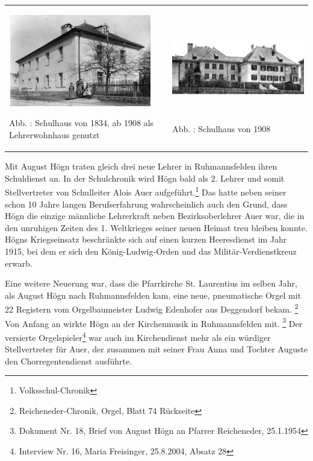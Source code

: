 \documentclass[a4paper]{article}
\newcounter{Abb}
\renewcommand\theAbb{\arabic{Abb}}
\begin{document}
\begin{flushleft}
\tablefirsthead{}
\tablehead{}
\tabletail{}
\tablelasttail{}
\begin{supertabular}{m{6.452cm}m{9.653cm}}

\includegraphics[width=6.269cm,height=3.999cm]{pictures/zulassungsarbeit-img017.jpg}

\label{bkm:Ref100034971}Abb. \stepcounter{Abb}{\theAbb}: Schulhaus von
1834, ab 1908 als Lehrerwohnhaus genutzt &

\includegraphics[width=9.47cm,height=4.001cm]{pictures/zulassungsarbeit-img018.jpg}

\label{bkm:Ref100034935}Abb. \stepcounter{Abb}{\theAbb}: Schulhaus von
1908\\
\end{supertabular}
\end{flushleft}
Mit August Högn traten gleich drei neue Lehrer in Ruhmannsfelden ihren
Schuldienst an. In der Schulchronik wird Högn bald als 2. Lehrer und
somit Stellvertreter von Schulleiter Alois Auer aufgeführt.\footnote{
Volksschul-Chronik} Das hatte neben seiner schon 10 Jahre langen
Berufserfahrung wahrscheinlich auch den Grund, dass Högn die einzige
männliche Lehrerkraft neben Bezirksoberlehrer Auer war, die in den
unruhigen Zeiten des 1. Weltkrieges seiner neuen Heimat treu bleiben
konnte. Högns Kriegseinsatz beschränkte sich auf einen kurzen
Heeresdienst im Jahr 1915, bei dem er sich den König-Ludwig-Orden und
das Militär-Verdienstkreuz erwarb.

Eine weitere Neuerung war, dass die Pfarrkirche St. Laurentius im selben
Jahr, als August Högn nach Ruhmannsfelden kam, eine neue, pneumatische
Orgel mit 22 Registern vom Orgelbaumeister Ludwig Edenhofer aus
Deggendorf bekam. \footnote{Reicheneder-Chronik, Orgel, Blatt 74
Rückseite} Von Anfang an wirkte Högn an der Kirchenmusik in
Ruhmannsfelden mit. \footnote{Dokument Nr. 18, Brief von August Högn an
Pfarrer Reicheneder, 25.1.1954} Der versierte Orgelspieler\footnote{
Interview Nr. 16, Maria Freisinger, 25.8.2004, Absatz 28} war auch im
Kirchendienst mehr als ein würdiger Stellvertreter für Auer, der
zusammen mit seiner Frau Anna und Tochter Auguste den
Chorregentendienst ausführte.
\end{document}
